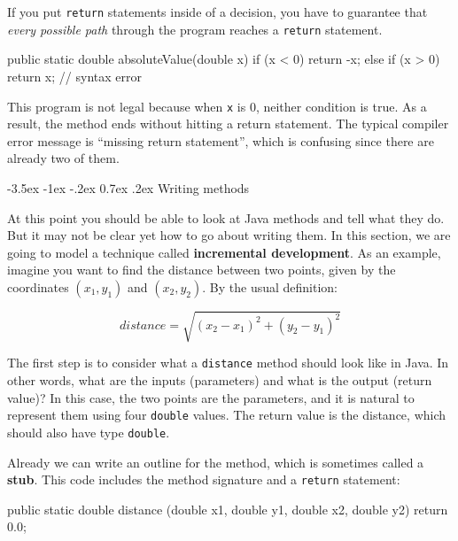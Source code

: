 \documentclass[12pt]{book}
\makeatletter
\theoremstyle{exercise}
\newcommand{\java}[1]{\verb"#1"}
\renewcommand{\section}{\@startsection {section}{1}{\z@}%
    {-3.5ex \@plus -1ex \@minus -.2ex}%
    {0.7ex \@plus.2ex}%
    {\normalfont\Large\bfseries}}
\newcommand{\java}[1]{\lstinline{#1}} %
\makeatother
\begin{document}
If you put \java{return} statements inside of a decision, you have to guarantee that {\em every possible path} through the program reaches a \java{return} statement.

\begin{code}
    public static double absoluteValue(double x) {
        if (x < 0) {
            return -x;
        } else if (x > 0) {
            return x;
        }
        // syntax error
    }
\end{code}

This program is not legal because when \java{x} is 0, neither condition is true.
As a result, the method ends without hitting a return statement.
The typical compiler error message is ``missing return statement'', which is confusing since there are already two of them.


\section{Writing methods}
\label{distance}


At this point you should be able to look at Java methods and tell what they do.
But it may not be clear yet how to go about writing them.
In this section, we are going to model a technique called {\bf incremental development}.
As an example, imagine you want to find the distance between two points, given by the coordinates $(x_1, y_1)$ and $(x_2, y_2)$.
By the usual definition:

\[ distance = \sqrt{(x_2 - x_1)^2 +(y_2 - y_1)^2} \]

The first step is to consider what a \java{distance} method should look like in Java.
In other words, what are the inputs (parameters) and what is the output (return value)?
In this case, the two points are the parameters, and it is natural to represent them using four \java{double} values.
The return value is the distance, which should also have type \java{double}.


Already we can write an outline for the method, which is sometimes called a {\bf stub}.
This code includes the method signature and a \java{return} statement:

\begin{code}
    public static double distance
            (double x1, double y1, double x2, double y2) {
        return 0.0;
    }
\end{code}
\end{document}
